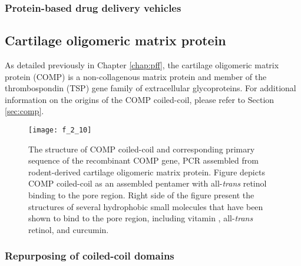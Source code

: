 \begin{refsection}
\subsubsection{Protein-based drug delivery vehicles}

\subsection{Cartilage oligomeric matrix protein}

As detailed previously in Chapter \ref{chap:pff}, the cartilage oligomeric
matrix protein (COMP) is a non-collagenous matrix protein and member of the
thrombospondin (TSP) gene family of extracellular
glycoproteins.\cite{Adams2001,Smith1997,Muller1998,Hedbom1992,Oldberg1992}
For additional information on the origins of the COMP coiled-coil, please refer
to Section \ref{sec:comp}.
\begin{figure}[h!] \centering \texttt{[image: f\_2\_10]}
    \caption[The structure of COMP coiled-coil and corresponding primary
        sequence of the recombinant COMP gene, PCR assembled from rodent-derived
        cartilage oligomeric matrix protein. Figure depicts COMP coiled-coil as
        an assembled pentamer with all-\emph{trans} retinol binding to the pore
    region.  Right side of the figure present the structures of several
hydrophobic small molecules that have been shown to bind to the pore region,
including vitamin , all-\emph{trans} retinol, and curcumin.] {The
    structure of COMP coiled-coil and corresponding primary sequence of the
    recombinant COMP gene, PCR assembled from rodent-derived cartilage
    oligomeric matrix protein. Figure depicts COMP coiled-coil as an assembled
    pentamer with all-\emph{trans} retinol binding to the pore region.  Right
    side of the figure present the structures of several hydrophobic small
    molecules that have been shown to bind to the pore region, including vitamin
    , all-\emph{trans} retinol, and
    curcumin.\cite{Gunasekar2009}}\label{fig:our_COMP} \end{figure}
\subsubsection{Repurposing of coiled-coil domains}


\end{refsection}
